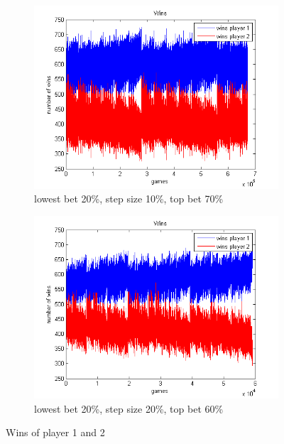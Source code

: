 \documentclass[11pt]{article}
\begin{document}
\begin{figure}[h]
	\centering
	\begin{subfigure}[b]{0.4\textwidth}
		\includegraphics[width=\textwidth]{wins_20_10_70}
		\caption{lowest bet 20\%, step size 10\%, top bet 70\%}
		\label{p1 best strat v2.2}
	\end{subfigure}
	\begin{subfigure}[b]{0.4\textwidth}
		\includegraphics[width=\textwidth]{wins_20_20_60}
		\caption{lowest bet 20\%, step size 20\%, top bet 60\%}
		\label{p1 best strat v2.2}
	\end{subfigure}
	\caption{Wins of player 1 and 2}
	\label{wins v4}
	
\end{figure}
\end{document}
